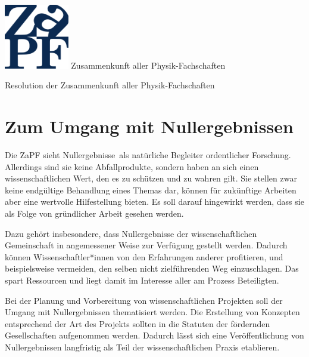 \documentclass[DIV=calc]{scrartcl}
\begin{document}
\hspace{0.87\textwidth}
\begin{minipage}{120pt}
\vspace{-1.8cm}
\includegraphics[width=80pt]{../../logo.pdf}
\centering
\small Zusammenkunft aller Physik-Fachschaften
\end{minipage}
\begin{center}
\huge{Resolution der Zusammenkunft aller Physik-Fachschaften} \\
\normalsize
\end{center}

\vspace{1.2cm}
\section*{Zum Umgang mit Nullergebnissen}
%
%
Die ZaPF sieht Nullergebnisse\footnotemark~als natürliche Begleiter ordentlicher Forschung. Allerdings sind sie keine Abfallprodukte, sondern haben an sich einen wissenschaftlichen Wert, den es zu schützen und zu wahren gilt. Sie stellen zwar keine endgültige Behandlung eines Themas dar, können für zukünftige Arbeiten aber eine wertvolle Hilfestellung bieten. Es soll darauf hingewirkt werden, dass sie als Folge von gründlicher Arbeit gesehen werden.

Dazu gehört insbesondere, dass Nullergebnisse der wissenschaftlichen Gemeinschaft in angemessener Weise zur Verfügung gestellt werden. Dadurch können Wissenschaftler*innen von den Erfahrungen anderer profitieren, und beispielsweise vermeiden, den selben nicht zielführenden Weg einzuschlagen. Das spart Ressourcen und liegt damit im Interesse aller am Prozess Beteiligten.

Bei der Planung und Vorbereitung von wissenschaftlichen Projekten soll der Umgang mit Nullergebnissen thematisiert werden. Die Erstellung von Konzepten entsprechend der Art des Projekts sollten in die Statuten der fördernden Gesellschaften aufgenommen werden. Dadurch lässt sich eine Veröffentlichung von Nullergebnissen langfristig als Teil der wissenschaftlichen Praxis etablieren. 
\end{document}
